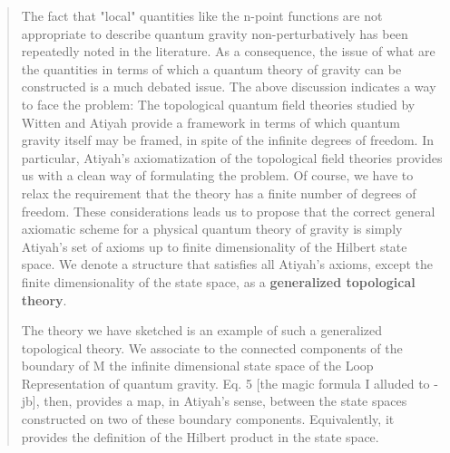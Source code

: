 \begin{quote}
The fact that "local" quantities like the n-point functions are not
appropriate to describe quantum gravity non-perturbatively has been
repeatedly noted in the literature.  As a consequence, the issue of
what are the quantities in terms of which a quantum theory of gravity can be
constructed is a much debated issue. The above discussion indicates
a way to face the problem: The topological quantum field theories studied by
Witten and Atiyah provide a framework in terms of which quantum gravity
itself may be framed, in spite of the infinite degrees of freedom.  In
particular, Atiyah's axiomatization of the topological field theories
provides us with a clean way of formulating the problem.  Of course, we
have to relax the requirement that the theory has a finite number of
degrees of freedom.  These considerations leads us to propose that the
correct general axiomatic scheme for a physical quantum theory of
gravity is simply Atiyah's set of axioms up to finite dimensionality
of the Hilbert state space. We denote a structure that satisfies all
Atiyah's axioms, except the finite dimensionality of the state space,  as
a \textbf{generalized topological theory}. 

The theory we have sketched is an example of such a generalized topological
theory. We associate to the connected
components of the boundary of M the infinite
dimensional state space of the Loop Representation of quantum
gravity.  Eq. 5 [the magic formula I alluded to - jb], then, provides a map,
in Atiyah's sense, between the state spaces constructed on two of these
boundary components. Equivalently, it provides the definition of the Hilbert
product in the state space.


\end{quote}

